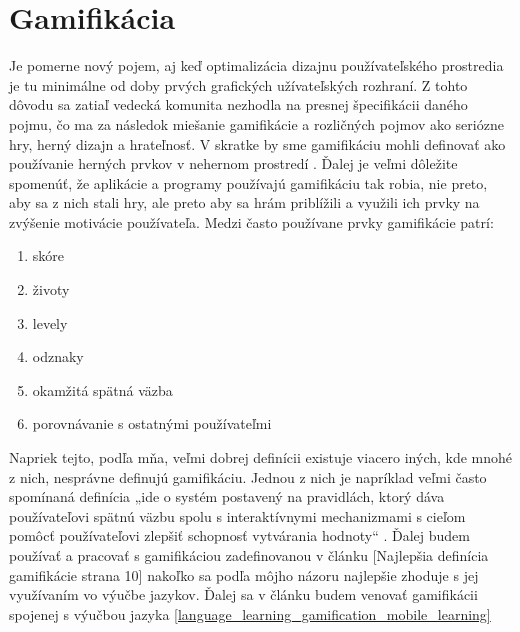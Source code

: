 \documentclass[10pt,slovak,a4paper]{article}
\begin{document}
\section{Gamifikácia} \label{gamification}

Je pomerne nový pojem, aj keď optimalizácia dizajnu používateľského prostredia je tu minimálne od doby prvých grafických užívateľských rozhraní. Z tohto dôvodu sa zatiaľ vedecká komunita nezhodla na presnej špecifikácii daného pojmu, čo ma za následok miešanie gamifikácie a rozličných pojmov ako seriózne hry, herný dizajn a hrateľnosť.
V skratke by sme gamifikáciu mohli definovať ako používanie herných prvkov v nehernom prostredí \cite[s. 10]{deterding2011game}. Ďalej je veľmi dôležite spomenúť, že aplikácie a programy používajú gamifikáciu tak robia, nie preto, aby sa z nich stali hry, ale preto aby sa hrám priblížili a využili ich prvky na zvýšenie motivácie používateľa.
Medzi často používane prvky gamifikácie patrí:
\begin{enumerate}
    \item skóre
    \item životy
    \item levely
    \item odznaky
    \item okamžitá spätná väzba
    \item porovnávanie s ostatnými používateľmi
\end{enumerate}

Napriek tejto, podľa mňa, veľmi dobrej definícii existuje viacero iných, kde mnohé z nich, nesprávne definujú gamifikáciu.
Jednou z nich je napríklad veľmi často spomínaná definícia „ide o systém postavený na pravidlách, ktorý dáva používateľovi spätnú väzbu spolu s interaktívnymi mechanizmami s cieľom pomôcť používateľovi zlepšiť schopnosť vytvárania hodnoty“ \cite[s. 25]{huotari2011gamification}. Ďalej budem používať a pracovať s gamifikáciou zadefinovanou v článku [Najlepšia definícia gamifikácie strana 10] nakoľko sa podľa môjho názoru najlepšie zhoduje s jej využívaním vo výučbe jazykov.
Ďalej sa v článku budem venovať gamifikácii spojenej s výučbou jazyka \ref{language_learning_gamification_mobile_learning}

\end{document}

